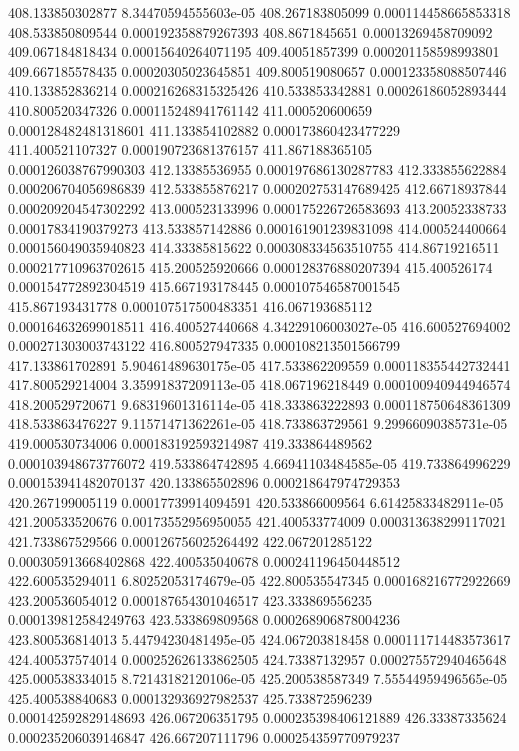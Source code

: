 {408.133850302877 8.34470594555603e-05
408.267183805099 0.000114458665853318
408.533850809544 0.000192358879267393
408.8671845651 0.00013269458709092
409.067184818434 0.00015640264071195
409.40051857399 0.000201158598993801
409.667185578435 0.00020305023645851
409.800519080657 0.000123358088507446
410.133852836214 0.000216268315325426
410.533853342881 0.00026186052893444
410.800520347326 0.000115248941761142
411.000520600659 0.000128482481318601
411.133854102882 0.000173860423477229
411.400521107327 0.000190723681376157
411.867188365105 0.000126038767990303
412.13385536955 0.000197686130287783
412.333855622884 0.000206704056986839
412.533855876217 0.000202753147689425
412.66718937844 0.000209204547302292
413.000523133996 0.000175226726583693
413.20052338733 0.00017834190379273
413.533857142886 0.000161901239831098
414.000524400664 0.000156049035940823
414.33385815622 0.000308334563510755
414.86719216511 0.000217710963702615
415.200525920666 0.000128376880207394
415.400526174 0.000154772892304519
415.667193178445 0.000107546587001545
415.867193431778 0.000107517500483351
416.067193685112 0.000164632699018511
416.400527440668 4.34229106003027e-05
416.600527694002 0.000271303003743122
416.800527947335 0.000108213501566799
417.133861702891 5.90461489630175e-05
417.533862209559 0.000118355442732441
417.800529214004 3.35991837209113e-05
418.067196218449 0.000100940944946574
418.200529720671 9.68319601316114e-05
418.333863222893 0.000118750648361309
418.533863476227 9.11571471362261e-05
418.733863729561 9.29966090385731e-05
419.000530734006 0.000183192593214987
419.333864489562 0.000103948673776072
419.533864742895 4.66941103484585e-05
419.733864996229 0.000153941482070137
420.133865502896 0.000218647974729353
420.267199005119 0.00017739914094591
420.533866009564 6.61425833482911e-05
421.200533520676 0.00173552956950055
421.400533774009 0.000313638299117021
421.733867529566 0.000126756025264492
422.067201285122 0.000305913668402868
422.400535040678 0.000241196450448512
422.600535294011 6.80252053174679e-05
422.800535547345 0.000168216772922669
423.200536054012 0.000187654301046517
423.333869556235 0.000139812584249763
423.533869809568 0.000268906878004236
423.800536814013 5.44794230481495e-05
424.067203818458 0.000111714483573617
424.400537574014 0.000252626133862505
424.73387132957 0.000275572940465648
425.000538334015 8.72143182120106e-05
425.200538587349 7.55544959496565e-05
425.400538840683 0.000132936927982537
425.733872596239 0.000142592829148693
426.067206351795 0.000235398406121889
426.33387335624 0.000235206039146847
426.667207111796 0.000254359770979237
}
